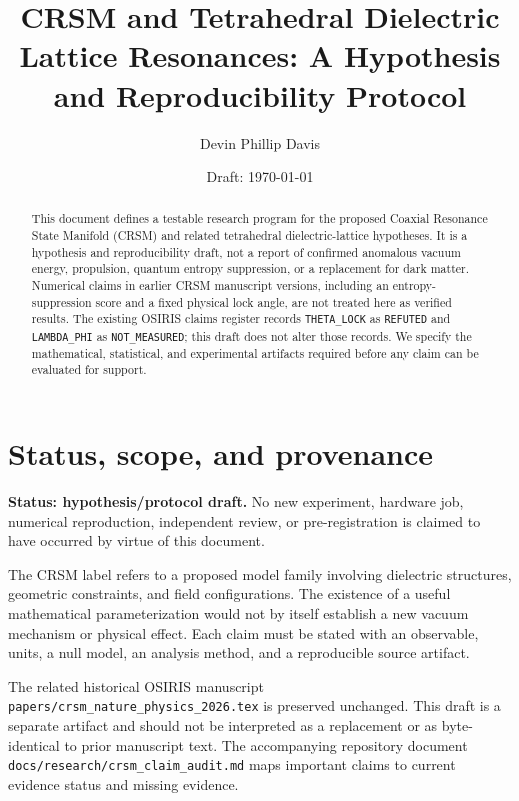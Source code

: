 \documentclass[aps,preprint,superscriptaddress,longbibliography]{revtex4-2}
\begin{document}
\title{CRSM and Tetrahedral Dielectric Lattice Resonances: A Hypothesis and Reproducibility Protocol}

\author{Devin Phillip Davis}

\date{Draft: \today}

\begin{abstract}
This document defines a testable research program for the proposed Coaxial
Resonance State Manifold (CRSM) and related tetrahedral dielectric-lattice
hypotheses. It is a hypothesis and reproducibility draft, not a report of
confirmed anomalous vacuum energy, propulsion, quantum entropy suppression,
or a replacement for dark matter. Numerical claims in earlier CRSM manuscript
versions, including an entropy-suppression score and a fixed physical lock
angle, are not treated here as verified results. The existing OSIRIS claims
register records \texttt{THETA\_LOCK} as \texttt{REFUTED} and
\texttt{LAMBDA\_PHI} as \texttt{NOT\_MEASURED}; this draft does not alter
those records. We specify the mathematical, statistical, and experimental
artifacts required before any claim can be evaluated for support.
\end{abstract}

\maketitle

\section{Status, scope, and provenance}

\textbf{Status: hypothesis/protocol draft.} No new experiment, hardware job,
numerical reproduction, independent review, or pre-registration is claimed
to have occurred by virtue of this document.

The CRSM label refers to a proposed model family involving dielectric
structures, geometric constraints, and field configurations. The existence
of a useful mathematical parameterization would not by itself establish a
new vacuum mechanism or physical effect. Each claim must be stated with an
observable, units, a null model, an analysis method, and a reproducible
source artifact.

The related historical OSIRIS manuscript
\texttt{papers/crsm\_nature\_physics\_2026.tex} is preserved unchanged.
This draft is a separate artifact and should not be interpreted as a
replacement or as byte-identical to prior manuscript text. The accompanying
repository document \texttt{docs/research/crsm\_claim\_audit.md} maps
important claims to current evidence status and missing evidence.
\end{document}
